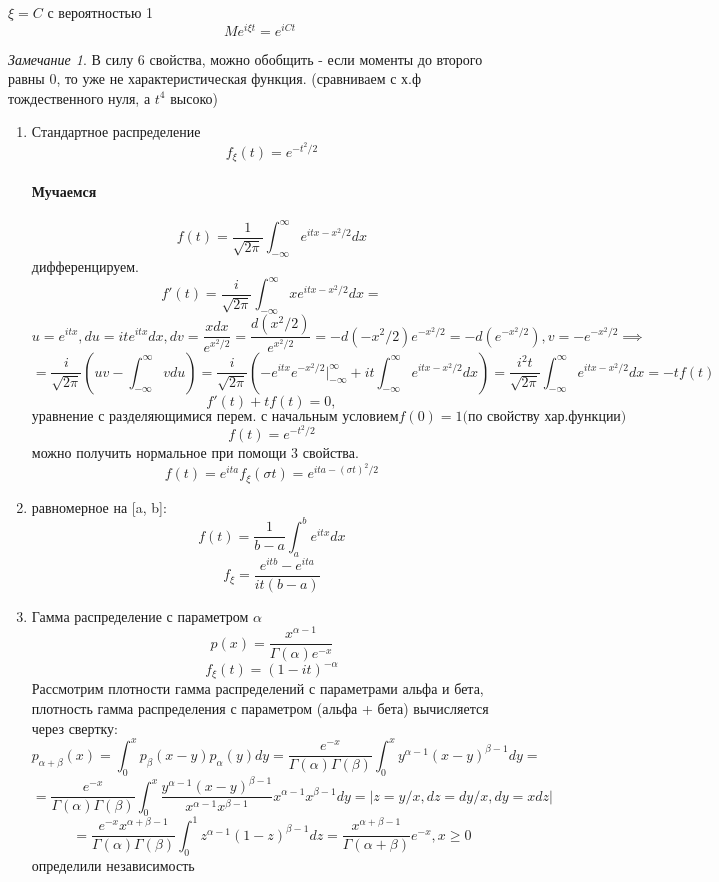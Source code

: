 \documentclass[a4paper]{article}
\theoremstyle{definition}
\theoremstyle{remark}
\newtheorem*{remark}{Замечание}
\begin{document}
$\xi = C $ с вероятностью 1
\[Me^{i\xi t} = e^{iCt}\]
\begin{remark}
    В силу 6 свойства, можно обобщить - если моменты до второго равны 0, то уже не характеристическая функция. (сравниваем с х.ф тождественного нуля, а $t^4$ высоко)
\end{remark}
\begin{enumerate}
    \item Стандартное распределение
    \[f_\xi(t) = e^{-t^2/2}\]
    \paragraph*{Мучаемся}
        \[f(t) = \frac1{\sqrt{2 \pi}}\int_{-\infty}^{\infty} e^{itx - x^2/2}dx\]
        дифференцируем.
        \[f'(t) = \frac{i}{\sqrt{2 \pi}}\int_{-\infty}^{\infty} xe^{itx - x^2/2}dx = \]
        \[u = e^{itx}, du = it e^{itx}dx, dv = \frac{xdx}{e^{x^2/2}} = \frac{d(x^2/2)}{e^{x^2/2}}= - d(-x^2/2)e^{-x^2/2} = -d(e^{-x^2/2}), v = -e^{-x^2/2}\implies\]
        \[ =\frac{i}{\sqrt{2 \pi}} (uv - \int_{-\infty}^{\infty} vdu)=\frac{i}{\sqrt{2 \pi}} ({-e^{itx}e^{-x^2/2}|_{-\infty}^{\infty} } + it\int_{-\infty}^{\infty} e^{itx - x^2/2}dx) = \frac{i^2 t}{\sqrt{2\pi}}\int_{-\infty}^{\infty} e^{itx - x^2/2}dx = -tf(t) \]
        \[f'(t) + tf(t) = 0,\] \[\text{уравнение с разделяющимися перем. с начальным условием} f(0) = 1 \text{(по свойству хар.функции)}\]
        \[f(t) = e^{-t^2/2}\]
    можно получить нормальное при помощи 3 свойства.
    \[f(t) = e^{ita} f_\xi(\sigma t) = e^{ita - (\sigma t)^2 /2} \]
    \item равномерное на [a, b]:
    \[f(t) = \frac1{b - a}\int_{a}^{b}e^{itx}dx\]
    \[f_\xi = \frac{e^{itb} - e^{ita}}{it(b-a)}\]
    \item Гамма распределение с параметром $\alpha$
    \[p(x) = \frac{x^{\alpha-1}}{\Gamma(\alpha)e^{-x}}\]
    \[f_\xi (t) = (1-it)^{-\alpha}\]
    Рассмотрим плотности гамма распределений с параметрами альфа и бета, плотность гамма распределения с параметром (альфа + бета) вычисляется через свертку:
    \[p_{\alpha + \beta}(x) = \int_{0}^{x}p_\beta(x-y)p_\alpha(y)dy = \frac{e^{-x}}{\Gamma(\alpha)\Gamma(\beta)}\int_{0}^{x}y^{\alpha - 1}(x-y)^{\beta - 1}dy = \] 
    \[ = \frac{e^{-x}}{\Gamma(\alpha)\Gamma(\beta)}\int_{0}^{x}\frac{y^{\alpha - 1}(x-y)^{\beta - 1}}{x^{\alpha-1}x^{\beta-1}}x^{\alpha-1}x^{\beta-1}dy = \left\lvert z = y/x, dz = dy/x, dy = xdz\right\rvert\] 
    \[ = \frac{e^{-x}x^{\alpha+\beta - 1}}{\Gamma(\alpha)\Gamma(\beta)}\int_{0}^{1} z^{\alpha-1}(1-z)^{\beta-1}dz = \frac{x^{\alpha+\beta-1}}{\Gamma(\alpha+\beta)}e^{-x}, x\ge 0\]
    определили независимость


\end{enumerate}
\end{document}
